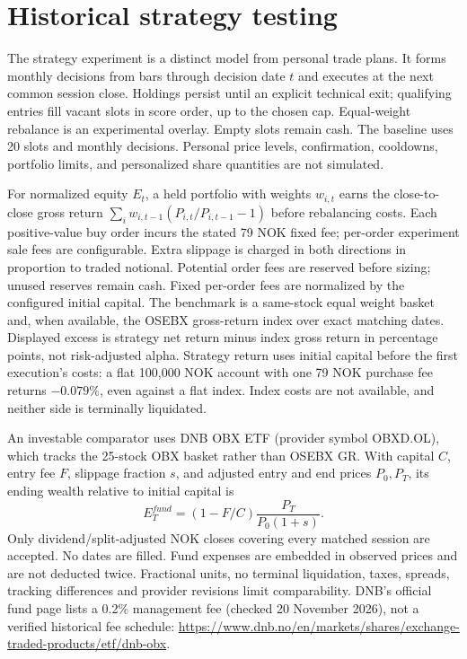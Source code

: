 \documentclass[11pt]{article}
\begin{document}
\section{Historical strategy testing}

The strategy experiment is a distinct model from personal trade plans. It
forms monthly decisions from bars through decision date $t$ and executes at
the next common session close. Holdings persist until an explicit technical
exit; qualifying entries fill vacant slots in score order, up to the chosen
cap. Equal-weight rebalance is an experimental overlay. Empty slots remain
cash. The baseline uses 20 slots and monthly decisions. Personal price levels,
confirmation, cooldowns, portfolio limits, and personalized share quantities
are not simulated.

For normalized equity $E_t$, a held portfolio with weights $w_{i,t}$ earns the
close-to-close gross return $\sum_iw_{i,t-1}(P_{i,t}/P_{i,t-1}-1)$ before
rebalancing costs. Each positive-value buy order incurs the stated 79 NOK
fixed fee; per-order experiment sale fees are configurable. Extra slippage is
charged in both directions in proportion to traded notional. Potential order
fees are reserved before sizing; unused reserves remain cash. Fixed per-order
fees are normalized by the configured initial capital. The benchmark is a same-stock equal
weight basket and, when available, the OSEBX gross-return index over exact
matching dates. Displayed excess is strategy net return minus index gross
return in percentage points, not risk-adjusted alpha. Strategy return uses
initial capital before the first execution's costs: a flat 100,000 NOK account
with one 79 NOK purchase fee returns $-0.079\%$, even against a flat index.
Index costs are not available, and neither side is terminally liquidated.

An investable comparator uses DNB OBX ETF (provider symbol OBXD.OL), which
tracks the 25-stock OBX basket rather than OSEBX GR. With capital $C$, entry
fee $F$, slippage fraction $s$, and adjusted entry and end prices $P_0,P_T$,
its ending wealth relative to initial capital is
\[
E_T^{fund}=(1-F/C)\frac{P_T}{P_0(1+s)}.
\]
Only dividend/split-adjusted NOK closes covering every matched session are
accepted. No dates are filled. Fund expenses are embedded in observed prices
and are not deducted twice. Fractional units, no terminal liquidation, taxes,
spreads, tracking differences and provider revisions limit comparability.
DNB's official fund page lists a 0.2\% management fee (checked 20 November
2026), not a verified historical fee schedule:
\url{https://www.dnb.no/en/markets/shares/exchange-traded-products/etf/dnb-obx}.
\end{document}
